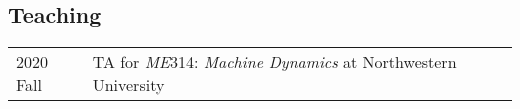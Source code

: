 \documentclass[margin,line,pifont,palatino,courier]{res}
\newenvironment{list2}{
	\begin{list}{$\bullet$}{%
			\setlength{\itemsep}{0in}
			\setlength{\parsep}{0in} \setlength{\parskip}{0in}
			\setlength{\topsep}{0in} \setlength{\partopsep}{0in}
			\setlength{\leftmargin}{0.2in}}}{\end{list}}
\begin{document}
\begin{resume}
		

\section{\sc Teaching}

		\begin{tabular}{@{}p{0.8in}p{4in}}
			2020 Fall & TA for \textit{ME}314: \textit{Machine Dynamics} at Northwestern University \\ 
		\end{tabular}


\end{resume}
\end{document}
